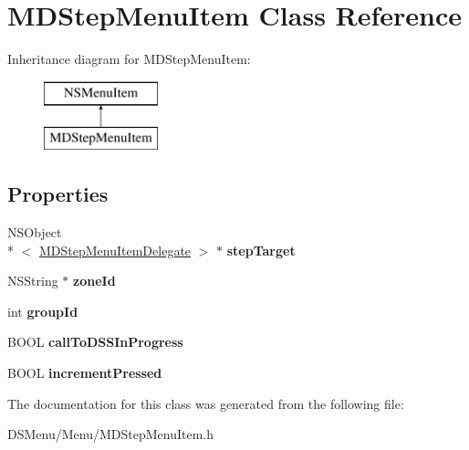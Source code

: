 \hypertarget{interface_m_d_step_menu_item}{\section{M\-D\-Step\-Menu\-Item Class Reference}
\label{interface_m_d_step_menu_item}
}
Inheritance diagram for M\-D\-Step\-Menu\-Item\-:\begin{figure}[H]
\begin{center}
\leavevmode
\includegraphics[height=2.000000cm]{interface_m_d_step_menu_item}
\end{center}
\end{figure}
\subsection*{Properties}
\begin{DoxyCompactItemize}
\item 
\hypertarget{interface_m_d_step_menu_item_a7f2a43062f7d8310e6b891386a95f604}{N\-S\-Object\\*
$<$ \hyperlink{protocol_m_d_step_menu_item_delegate-p}{M\-D\-Step\-Menu\-Item\-Delegate} $>$ $\ast$ {\bfseries step\-Target}}\label{interface_m_d_step_menu_item_a7f2a43062f7d8310e6b891386a95f604}

\item 
\hypertarget{interface_m_d_step_menu_item_afe251b48c80fad27565da644620a10d4}{N\-S\-String $\ast$ {\bfseries zone\-Id}}\label{interface_m_d_step_menu_item_afe251b48c80fad27565da644620a10d4}

\item 
\hypertarget{interface_m_d_step_menu_item_addd07374d60e605ac20a9bcc1908b72f}{int {\bfseries group\-Id}}\label{interface_m_d_step_menu_item_addd07374d60e605ac20a9bcc1908b72f}

\item 
\hypertarget{interface_m_d_step_menu_item_a0d3d499e5bdc7179dbbafcbf18f219ec}{B\-O\-O\-L {\bfseries call\-To\-D\-S\-S\-In\-Progress}}\label{interface_m_d_step_menu_item_a0d3d499e5bdc7179dbbafcbf18f219ec}

\item 
\hypertarget{interface_m_d_step_menu_item_a8e340c355d9a701f437afd88ac298cf0}{B\-O\-O\-L {\bfseries increment\-Pressed}}\label{interface_m_d_step_menu_item_a8e340c355d9a701f437afd88ac298cf0}

\end{DoxyCompactItemize}


The documentation for this class was generated from the following file\-:\begin{DoxyCompactItemize}
\item 
D\-S\-Menu/\-Menu/M\-D\-Step\-Menu\-Item.\-h\end{DoxyCompactItemize}
